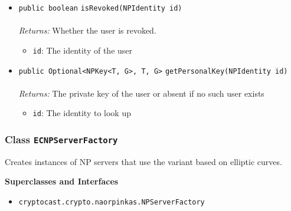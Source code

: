 \begin{itemize}
\item \lstinline|public boolean| \lstinline|isRevoked|\lstinline|(NPIdentity id)|\\ \\[-0.6em]
\emph{Returns:} Whether the user is revoked.
\begin{itemize}
\item \lstinline|id|: The identity of the user
\end{itemize}



\item \lstinline|public Optional<NPKey<T, G>, T, G>| \lstinline|getPersonalKey|\lstinline|(NPIdentity id)|\\ \\[-0.6em]
\emph{Returns:} The private key of the user or absent if no
 such user exists
\begin{itemize}
\item \lstinline|id|: The identity to look up
\end{itemize}



\end{itemize}

\subsubsection{Class \lstinline|ECNPServerFactory|}
Creates instances of NP servers that use the variant based on elliptic
 curves. \\
\noindent\begin{minipage}[t]{5cm}
\vspace{0.3em}
\hspace*{2em}
\vspace{0.3em}
\end{minipage}



\textbf{\sffamily Superclasses and Interfaces}
\begin{itemize}
\item \lstinline|cryptocast.crypto.naorpinkas.NPServerFactory|
\end{itemize}



